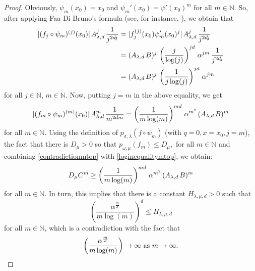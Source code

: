 \documentclass[12pt,reqno]{amsart} %
\numberwithin{equation}{section}
\begin{document}
\begin{proof}
Obviously, $\psi_m(x_0)=x_0$ and $\psi_m'(x_0)=\psi'(x_0)^m$ for all $m\in\mathbb{N}$. So, after applying Faa Di Bruno's formula (see, for instance, \cite[Lemma 4.1.]{jmaa}), we obtain that \begin{equation*}\begin{split}
		|(f_j\circ \psi_m)^{(j)}(x_0)|\hspace{0.05cm} A_{\lambda, d}^j\hspace{0.05cm}\frac{1}{j^{2dj}}&=  |f_j^{(j)}(x_0)\psi_m'(x_0)^j| \hspace{0.05cm} A_{\lambda, d}^j\hspace{0.05cm}\frac{1}{j^{2dj}}\\&=(A_{\lambda, d}\hspace{0.05cm}B)^j\hspace{0.05cm}\left(\frac{j}{\log(j)}\right)^{jd} \hspace{0.05cm} \alpha^{jm} \hspace{0.05cm}\frac{1}{j^{2dj}} \\&=(A_{\lambda, d}\hspace{0.05cm}B)^j\hspace{0.05cm}\left(\frac{1}{j\log(j)}\right)^{jd} \hspace{0.05cm} \alpha^{jm}
	\end{split}
\end{equation*} for all $j\in\mathbb{N}$, $m\in\mathbb{N}$. Now, putting $j=m$ in the above equality, we get \begin{equation}\label{loginequalitymtop}
	|(f_m\circ \psi_m)^{(m)}(x_0)|\hspace{0.05cm} A_{\lambda, d}^m\hspace{0.05cm}\frac{1}{m^{2dm}}= \left(\frac{1}{m\log(m)}\right)^{md} \hspace{0.05cm} \alpha^{m^2} \hspace{0.05cm} (A_{\lambda, d}\hspace{0.05cm} B)^m
\end{equation} for all $m\in\mathbb{N}$. Using the definition of $p_{\sigma, \lambda}(f\circ \psi_m)$ (with $q=0, x=x_0, j=m$), the fact that there is $D_\mu>0$ so that $p_{\omega, \mu}(f_m)\leq D_\mu,$ for all $m\in\mathbb{N}$ and combining \eqref{contradictionmtop} with \eqref{loginequalitymtop}, we obtain: \begin{equation*}
	D_\mu C^m \geq \left(\frac{1}{m\log(m)}\right)^{md} \hspace{0.05cm} \alpha^{m^2} \hspace{0.05cm} (A_{\lambda, d} \hspace{0.05cm} B)^m
\end{equation*} for all $m\in\mathbb{N}$. In turn, this implies that there is a constant $H_{\lambda,\mu, d}>0$ such that \begin{equation*}
	\left(\frac{\alpha^{\frac{m}{d}}}{m\log(m)}\right)^{d} \leq H_{\lambda,\mu, d}
\end{equation*} for all $m\in\mathbb{N}$, which is a contradiction with the fact that $$\left(\frac{\alpha^{\frac{m}{d}}}{m\log(m)}\right)\to \infty \mbox{ as } m\to \infty.\qedhere
$$
\end{proof}
\end{document}
